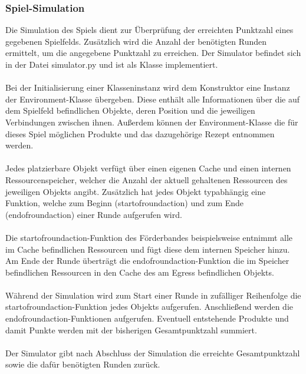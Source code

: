 \subsubsection{Spiel-Simulation}
Die Simulation des Spiels dient zur Überprüfung der erreichten Punktzahl eines gegebenen Spielfelds. Zusätzlich wird die Anzahl der benötigten Runden ermittelt, um die angegebene Punktzahl zu erreichen. Der Simulator befindet sich in der Datei simulator.py und ist als Klasse implementiert.
\\\\
Bei der Initialisierung einer Klasseninstanz wird dem Konstruktor eine Instanz der Environment-Klasse übergeben. Diese enthält alle Informationen über die auf dem Spielfeld befindlichen Objekte, deren Position und die jeweiligen Verbindungen zwischen ihnen. Außerdem können der Environment-Klasse die für dieses Spiel möglichen Produkte und das dazugehörige Rezept entnommen werden.
\\\\
Jedes platzierbare Objekt verfügt über einen eigenen Cache und einen internen Ressourcenspeicher, welcher die Anzahl der aktuell gehaltenen Ressourcen des jeweiligen Objekts angibt. Zusätzlich hat jedes Objekt typabhängig eine Funktion, welche zum Beginn (start\textunderscore{}of\textunderscore{}round\textunderscore{}action) und zum Ende (end\textunderscore{}of\textunderscore{}round\textunderscore{}action) einer Runde aufgerufen wird.
\\\\
Die start\textunderscore{}of\textunderscore{}round\textunderscore{}action-Funktion des Förderbandes beispielsweise entnimmt alle im Cache befindlichen Ressourcen und fügt diese dem internen Speicher hinzu. Am Ende der Runde überträgt die  end\textunderscore{}of\textunderscore{}round\textunderscore{}action-Funktion die im Speicher befindlichen Ressourcen in den Cache des am Egress befindlichen Objekts.
\\\\
Während der Simulation wird zum Start einer Runde in zufälliger Reihenfolge die start\textunderscore{}of\textunderscore{}round\textunderscore{}action-Funktion jedes Objekts aufgerufen. Anschließend werden die end\textunderscore{}of\textunderscore{}round\textunderscore{}action-Funktionen aufgerufen. Eventuell entstehende Produkte und damit Punkte werden mit der bisherigen Gesamtpunktzahl summiert.
\\\\
Der Simulator gibt nach Abschluss der Simulation die erreichte Gesamtpunktzahl sowie die dafür benötigten Runden zurück.

